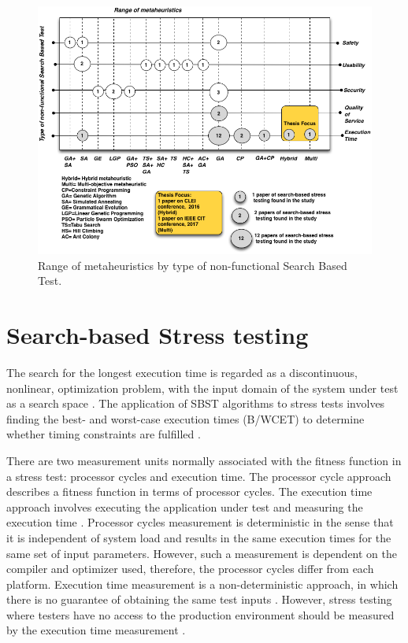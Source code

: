 \documentclass[espaco=umemeio,chapter=TITLE,twoside,openright]{abnt}
\begin{document}
\begin{figure}[h]
\centering
\includegraphics[width=1\textwidth]{./images/metaheuristics.png}
\caption{Range of metaheuristics by type of non-functional Search Based Test\cite{Afzal2009a}. }
\label{fig:metabykind}
\end{figure}


\section{Search-based Stress testing}

The search for the longest execution time is regarded as a discontinuous, nonlinear, optimization problem, with the input domain of the system under test as a search space \cite{Sullivan}.  The application of SBST algorithms to  stress tests involves finding the best- and worst-case execution times (B/WCET) to determine whether timing constraints are fulfilled \cite{Afzal2009a}.

There are two measurement units normally associated with the fitness function in a stress test: processor cycles and execution time. The processor cycle approach describes a fitness function in terms of processor cycles. The execution time approach involves executing the application under test and measuring the execution time \cite{Afzal2009a} \cite{tracey2000search}. Processor cycles measurement is deterministic in the sense that it is independent of system load and results in the same execution times for the same set of input parameters. However, such a measurement is dependent on the compiler and optimizer used, therefore, the processor cycles differ from each platform. Execution time measurement is a non-deterministic approach, in which there is no guarantee of obtaining the same test inputs \cite{Afzal2009a}.  However, stress testing where testers have no access to the production environment should be measured by the execution time measurement \cite{Molyneaux2009} \cite{Afzal2009a}.
\end{document}
